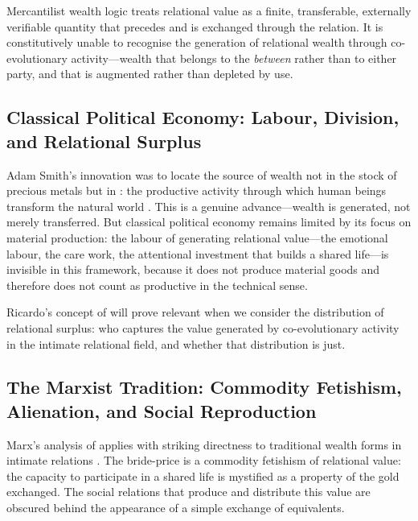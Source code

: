 \begin{claim}
Mercantilist wealth logic treats relational value as a finite, transferable, externally verifiable quantity that precedes and is exchanged through the relation. It is constitutively unable to recognise the generation of relational wealth through co-evolutionary activity---wealth that belongs to the \emph{between} rather than to either party, and that is augmented rather than depleted by use.
\end{claim}

\subsection{Classical Political Economy: Labour, Division, and Relational Surplus}
\label{p15:subsec:classical}

\noindent
Adam Smith's innovation was to locate the source of wealth not in the stock of precious metals but in : the productive activity through which human beings transform the natural world \parencite{sen1999}. This is a genuine advance---wealth is generated, not merely transferred. But classical political economy remains limited by its focus on material production: the labour of generating relational value---the emotional labour, the care work, the attentional investment that builds a shared life---is invisible in this framework, because it does not produce material goods and therefore does not count as productive in the technical sense.

Ricardo's concept of  will prove relevant when we consider the distribution of relational surplus: who captures the value generated by co-evolutionary activity in the intimate relational field, and whether that distribution is just.

\subsection{The Marxist Tradition: Commodity Fetishism, Alienation, and Social Reproduction}
\label{p15:subsec:marx}

\noindent
Marx's analysis of  applies with striking directness to traditional wealth forms in intimate relations \parencite{marx1976}. The bride-price is a commodity fetishism of relational value: the capacity to participate in a shared life is mystified as a property of the gold exchanged. The social relations that produce and distribute this value are obscured behind the appearance of a simple exchange of equivalents.

